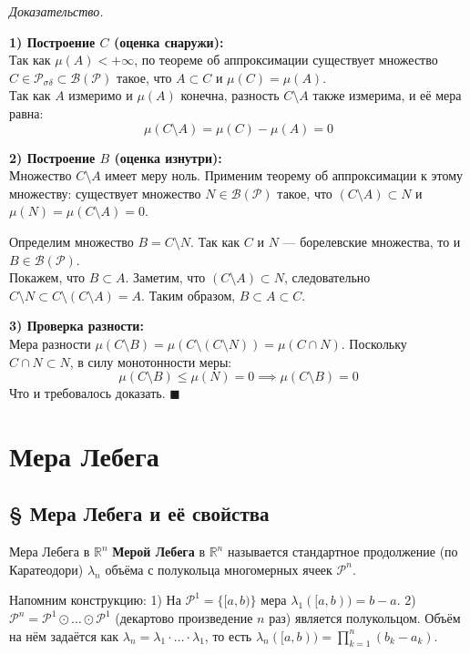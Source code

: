 \documentclass[12pt,a4paper]{article}
\newenvironment{Proof}[1][Доказательство]{\vspace{0.5em}\noindent\textit{#1.}\hspace{0.5em}\ignorespaces}{\hfill$\blacksquare$\vspace{1em}}
\begin{document}
\begin{Proof}
\textit{}

\textbf{1) Построение $C$ (оценка снаружи):} \\
Так как $\mu(A) < +\infty$, по теореме об аппроксимации существует множество $C \in \mathcal{P}_{\sigma\delta} \subset \mathcal{B}(\mathcal{P})$ такое, что $A \subset C$ и $\mu(C) = \mu(A)$. \\
Так как $A$ измеримо и $\mu(A)$ конечна, разность $C \setminus A$ также измерима, и её мера равна:
$$ \mu(C \setminus A) = \mu(C) - \mu(A) = 0 $$

\textbf{2) Построение $B$ (оценка изнутри):} \\
Множество $C \setminus A$ имеет меру ноль. Применим теорему об аппроксимации к этому множеству: существует множество $N \in \mathcal{B}(\mathcal{P})$ такое, что $(C \setminus A) \subset N$ и $\mu(N) = \mu(C \setminus A) = 0$.

Определим множество $B = C \setminus N$. Так как $C$ и $N$ — борелевские множества, то и $B \in \mathcal{B}(\mathcal{P})$. \\
Покажем, что $B \subset A$. Заметим, что $(C \setminus A) \subset N$, следовательно $C \setminus N \subset C \setminus (C \setminus A) = A$. Таким образом, $B \subset A \subset C$.

\textbf{3) Проверка разности:} \\
Мера разности $\mu(C \setminus B) = \mu(C \setminus (C \setminus N)) = \mu(C \cap N)$. 
Поскольку $C \cap N \subset N$, в силу монотонности меры:
$$ \mu(C \setminus B) \le \mu(N) = 0 \implies \mu(C \setminus B) = 0 $$
Что и требовалось доказать.
\end{Proof}
\section{Мера Лебега}
\subsection{§ Мера Лебега и её свойства}

\begin{Definition}{Мера Лебега в $\mathbb{R}^n$}{}
\textbf{Мерой Лебега} в $\mathbb{R}^n$ называется стандартное продолжение (по Каратеодори) $\lambda_n$ объёма с полукольца многомерных ячеек $\mathcal{P}^n$.
\end{Definition}

Напомним конструкцию:
1) На $\mathcal{P}^1 = \{[a, b)\}$ мера $\lambda_1([a, b)) = b - a$.
2) $\mathcal{P}^n = \mathcal{P}^1 \odot \dots \odot \mathcal{P}^1$ (декартово произведение $n$ раз) является полукольцом. Объём на нём задаётся как $\lambda_n = \lambda_1 \cdot \dots \cdot \lambda_1$, то есть $\lambda_n([a, b)) = \prod\limits_{k=1}^n (b_k - a_k)$.
\end{document}

